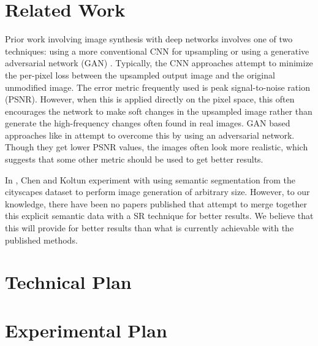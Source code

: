 \documentclass[10pt,twocolumn,letterpaper]{article}
\begin{document}
\section{Related Work}
Prior work involving image synthesis with deep networks involves one of two
techniques: using a more conventional CNN for upsampling
\cite{PerceptualLosses} \cite{RealtimeCNN} \cite{DeeplyRecursive} or using a
generative adversarial network (GAN) \cite{GAN}. Typically, the CNN approaches
attempt to minimize the per-pixel loss between the upsampled output image and
the original unmodified image. The error metric frequently used is peak
signal-to-noise ration (PSNR). However, when this is applied directly on the
pixel space, this often encourages the network to make soft changes in the
upsampled image rather than generate the high-frequency changes often found in
real images. GAN based approaches like in \cite{SRGAN} attempt to overcome this
by using an adversarial network. Though they get lower PSNR values, the images
often look more realistic, which suggests that some other metric should be used
to get better results.

In \cite{ImageSynthesis}, Chen and Koltun experiment with using semantic
segmentation from the cityscapes dataset \cite{Cityscapes} to perform image
generation of arbitrary size. However, to our knowledge, there have been no
papers published that attempt to merge together this explicit semantic data
with a SR technique for better results. We believe that this will provide for
better results than what is currently achievable with the published methods.


\section{Technical Plan}


\section{Experimental Plan}

\end{document}
